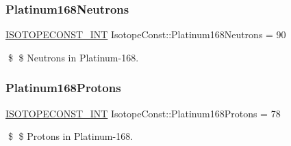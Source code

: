 \subsubsection{\texorpdfstring{Platinum168\+Neutrons}{Platinum168Neutrons}}
{\footnotesize\ttfamily \mbox{\hyperlink{group___isotope_const-_macros_ga5f18360b3e99483a35c32d789e62621c}{I\+S\+O\+T\+O\+P\+E\+C\+O\+N\+S\+T\+\_\+\+I\+NT}} Isotope\+Const\+::\+Platinum168\+Neutrons = 90}

\$ \$ Neutrons in Platinum-\/168. \mbox{\label{group___isotope_const-_platinum-_pt168_ga699f206b505f675aa4486260e657c152}} 
\subsubsection{\texorpdfstring{Platinum168\+Protons}{Platinum168Protons}}
{\footnotesize\ttfamily \mbox{\hyperlink{group___isotope_const-_macros_ga5f18360b3e99483a35c32d789e62621c}{I\+S\+O\+T\+O\+P\+E\+C\+O\+N\+S\+T\+\_\+\+I\+NT}} Isotope\+Const\+::\+Platinum168\+Protons = 78}

\$ \$ Protons in Platinum-\/168. 